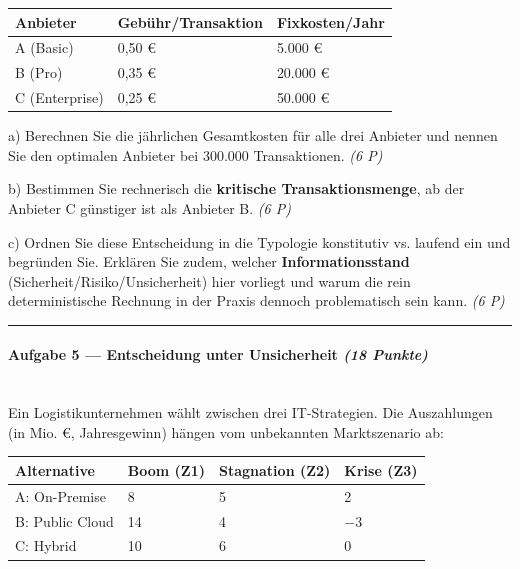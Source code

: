 \documentclass[11pt, a4paper]{article}
\begin{document}
{\small
\begin{tabularx}{\linewidth}{XXX}
\hline
\rowcolor{tableheadbg}
{\color{white}\textbf{Anbieter}} & {\color{white}\textbf{Gebühr/Transaktion}} & {\color{white}\textbf{Fixkosten/Jahr}} \\[2pt]
\hline
\endhead
\hline
\endfoot
A (Basic) & 0,50 € & 5.000 € \\
B (Pro) & 0,35 € & 20.000 € \\
C (Enterprise) & 0,25 € & 50.000 € \\
\end{tabularx}
}


a) Berechnen Sie die jährlichen Gesamtkosten für alle drei Anbieter und nennen Sie den optimalen Anbieter bei 300.000 Transaktionen. \textit{(6 P)}


b) Bestimmen Sie rechnerisch die \textbf{kritische Transaktionsmenge}, ab der Anbieter C günstiger ist als Anbieter B. \textit{(6 P)}


c) Ordnen Sie diese Entscheidung in die Typologie konstitutiv vs. laufend ein und begründen Sie. Erklären Sie zudem, welcher \textbf{Informationsstand} (Sicherheit/Risiko/Unsicherheit) hier vorliegt und warum die rein deterministische Rechnung in der Praxis dennoch problematisch sein kann. \textit{(6 P)}



\noindent\textcolor{rulegray}{\rule{\linewidth}{0.4pt}}


\paragraph{Aufgabe 5 — Entscheidung unter Unsicherheit \textit{(18 Punkte)}}\mbox{}\\[2pt]

Ein Logistikunternehmen wählt zwischen drei IT-Strategien. Die Auszahlungen (in Mio. €, Jahresgewinn) hängen vom unbekannten Marktszenario ab:



{\small
\begin{tabularx}{\linewidth}{XXXX}
\hline
\rowcolor{tableheadbg}
{\color{white}\textbf{Alternative}} & {\color{white}\textbf{Boom (Z1)}} & {\color{white}\textbf{Stagnation (Z2)}} & {\color{white}\textbf{Krise (Z3)}} \\[2pt]
\hline
\endhead
\hline
\endfoot
A: On-Premise & 8 & 5 & 2 \\
B: Public Cloud & 14 & 4 & −3 \\
C: Hybrid & 10 & 6 & 0 \\
\end{tabularx}
}
\end{document}
